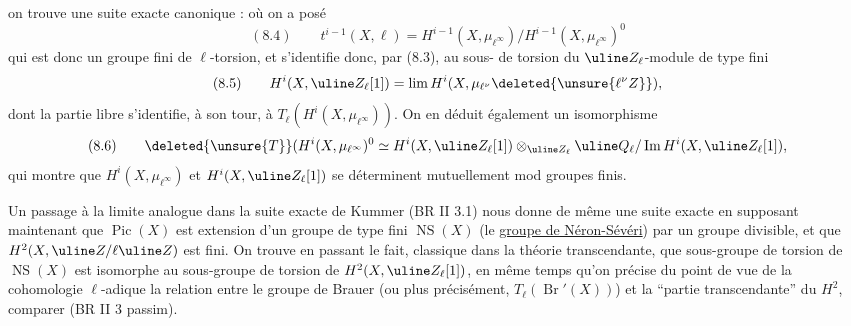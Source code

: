 

on trouve une suite exacte canonique :
où  on a posé
\[
(8.4)\qquad t^{i-1}(X,\ell)=H^{i-1}(X,\mu_{\ell^\infty})/H^{i-1}(X,\mu_{\ell^\infty})^0
\]
qui est donc un groupe fini de $\ell$-torsion, et s'identifie donc, par (8.3), au sous- de torsion du $\uline Z_\ell$-module de type fini
\[
(8.5)\qquad H^i(X,\uline Z_\ell[1])=\lim H^i(X,\mu_{\ell^\nu}\deleted{\unsure{\ell^\nu Z}}),
\]
dont la partie libre s'identifie, à son tour, à $T_\ell(H^i(X,\mu_{\ell^\infty}))$. On en déduit également un isomorphisme
\[
(8.6)\qquad \deleted{\unsure{T}}(H^i(X,\mu_{\ell^\infty})^0\simeq H^i(X,\uline Z_\ell[1])\otimes_{\uline Z_\ell}\uline Q_\ell/\operatorname{Im}H^i(X,\uline Z_\ell[1]),
\]
qui montre que $H^i(X,\mu_{\ell^\infty})$ et $H^i(X,\uline Z_\ell[1])$ se déterminent mutuellement mod groupes  finis.

 Un passage à la limite analogue dans la suite exacte de Kummer (BR II 3.1) nous donne de même une suite exacte
en supposant maintenant que $\operatorname{Pic}(X)$ est extension d'un groupe de type fini $\operatorname{NS}(X)$ (le \uline{groupe de Néron-Sévéri}) par un groupe divisible, et que $H^2(X,\uline Z/\ell\uline Z)$ est fini. On trouve en passant le fait, classique dans la théorie transcendante, que  sous-groupe de torsion de $\operatorname{NS}(X)$ est isomorphe au sous-groupe de torsion de $H^2(X,\uline Z_\ell[1])$, en même temps qu'on précise du point de vue de la cohomologie $\ell$-adique la relation entre le groupe de Brauer (ou plus précisément, $T_\ell(\operatorname{Br}'(X))$) et la ``partie transcendante'' du $H^2$, comparer (BR II 3 passim).

